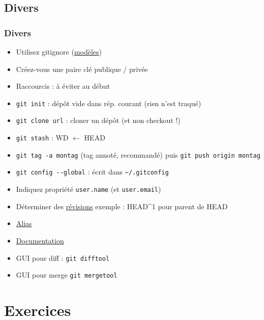 \documentclass[english, french]{beamer}
\begin{document}
\subsection{Divers}
\begin{frame}
	\frametitle{Divers}
	\vspace{-1pt}
	\begin{itemize}
		\item Utilisez gitignore {\tiny (\href{https://github.com/github/gitignore}{modèles})}
		\item Créez-vous une paire clé publique / privée
		\item Raccourcis : à éviter au début
		\item \texttt{git init} : dépôt vide dans rép. courant (rien n’est traqué)
		\item \texttt{git clone url} : cloner un dépôt (et non checkout !)
		\item \texttt{git stash} : WD $←$ HEAD
		\item \texttt{git tag -a montag} {\tiny (tag annoté, recommandé)} puis \texttt{git push origin montag}
		\item \texttt{git config -{}-global} : écrit dans \texttt{\textasciitilde/.gitconfig}
		\item Indiquez propriété \texttt{user.name} (et \texttt{user.email})
		\item Déterminer des \href{https://git-scm.com/book/en/v2/Git-Tools-Revision-Selection}{révisions} {\tiny exemple : HEAD\textasciicircum 1 pour parent de HEAD}
		\item \href{https://git-scm.com/book/en/v2/Git-Basics-Git-Aliases}{Alias}
		\item \href{https://git-scm.com/book/en/v2}{Documentation}
		\item GUI pour diff : \texttt{git difftool}
		\item GUI pour merge \texttt{git mergetool}
	\end{itemize}
\end{frame}

\section{Exercices}
\end{document}
